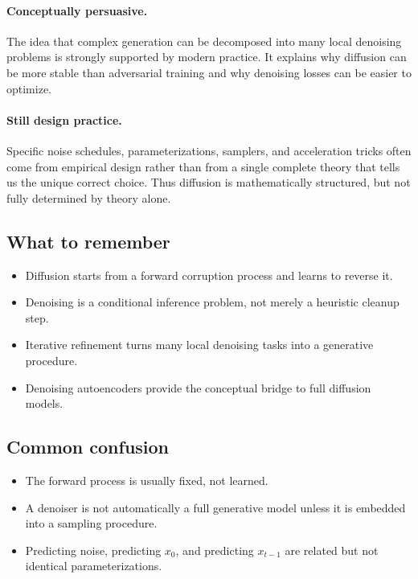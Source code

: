 \paragraph{Conceptually persuasive.}
The idea that complex generation can be decomposed into many local denoising problems is strongly supported by modern practice.
It explains why diffusion can be more stable than adversarial training and why denoising losses can be easier to optimize.

\paragraph{Still design practice.}
Specific noise schedules, parameterizations, samplers, and acceleration tricks often come from empirical design rather than from a single complete theory that tells us the unique correct choice.
Thus diffusion is mathematically structured, but not fully determined by theory alone.

\subsection*{What to remember}

\begin{itemize}
    \item Diffusion starts from a forward corruption process and learns to reverse it.
    \item Denoising is a conditional inference problem, not merely a heuristic cleanup step.
    \item Iterative refinement turns many local denoising tasks into a generative procedure.
    \item Denoising autoencoders provide the conceptual bridge to full diffusion models.
\end{itemize}

\subsection*{Common confusion}

\begin{itemize}
    \item The forward process is usually fixed, not learned.
    \item A denoiser is not automatically a full generative model unless it is embedded into a sampling procedure.
    \item Predicting noise, predicting $x_0$, and predicting $x_{t-1}$ are related but not identical parameterizations.
\end{itemize}

